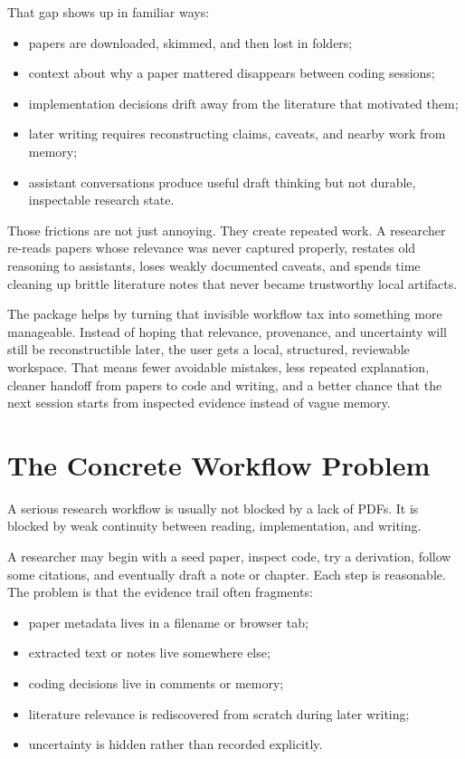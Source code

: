 \documentclass[11pt,a4paper,openany]{book}
\begin{document}
That gap shows up in familiar ways:
\begin{itemize}[nosep]
  \item papers are downloaded, skimmed, and then lost in folders;
  \item context about why a paper mattered disappears between coding sessions;
  \item implementation decisions drift away from the literature that motivated
        them;
  \item later writing requires reconstructing claims, caveats, and nearby work
        from memory;
  \item assistant conversations produce useful draft thinking but not durable,
        inspectable research state.
\end{itemize}

Those frictions are not just annoying. They create repeated work. A researcher
re-reads papers whose relevance was never captured properly, restates old
reasoning to assistants, loses weakly documented caveats, and spends time
cleaning up brittle literature notes that never became trustworthy local
artifacts.

The package helps by turning that invisible workflow tax into something more
manageable. Instead of hoping that relevance, provenance, and uncertainty will
still be reconstructible later, the user gets a local, structured, reviewable
workspace. That means fewer avoidable mistakes, less repeated explanation,
cleaner handoff from papers to code and writing, and a better chance that the
next session starts from inspected evidence instead of vague memory.

\chapter{The Concrete Workflow Problem}

A serious research workflow is usually not blocked by a lack of PDFs. It is
blocked by weak continuity between reading, implementation, and writing.

A researcher may begin with a seed paper, inspect code, try a derivation, follow
some citations, and eventually draft a note or chapter. Each step is reasonable.
The problem is that the evidence trail often fragments:
\begin{itemize}[nosep]
  \item paper metadata lives in a filename or browser tab;
  \item extracted text or notes live somewhere else;
  \item coding decisions live in comments or memory;
  \item literature relevance is rediscovered from scratch during later writing;
  \item uncertainty is hidden rather than recorded explicitly.
\end{itemize}
\end{document}

